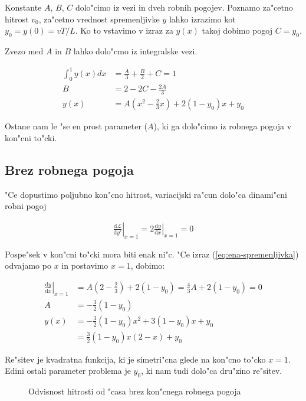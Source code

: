 \documentclass[12pt]{article}
\newcommand{\dd}{\mathrm{d}}
\begin{document}
Konstante $A$, $B$, $C$ dolo"cimo iz vezi in dveh robnih pogojev. Poznamo za"cetno hitrost $v_0$, za"cetno vrednost spremenljivke $y$ lahko izrazimo kot $y_0 = y(0) = v T / L$. Ko to vstavimo v izraz za $y(x)$ takoj dobimo pogoj $C = y_0$. 

Zvezo med $A$ in $B$ lahko dolo"cmo iz integralske vezi. 

\begin{align}
\int_0^1 y(x) dx &= \frac{A}{3} + \frac{B}{2} + C = 1 \\
B &= 2 - 2C - \frac{2A}{3} \\
y(x) &= A(x^2 - \frac{2}{3}x) + 2(1-y_0)x + y_0 \label{eq:ena-spremenljivka}
\end{align}

Ostane nam le "se en prost parameter ($A$), ki ga dolo"cimo iz robnega pogoja v kon"cni to"cki. 

\subsection{Brez robnega pogoja}
"Ce dopustimo poljubno kon"cno hitrost, variacijski ra"cun dolo"ca dinami"cni robni pogoj 

\begin{align}
\left.\frac{\dd \mathcal L}{\dd y'}\right|_{x=1} = 2\left.\frac{\dd y}{\dd x}\right|_{x=1} = 0 
\end{align}

Pospe"sek v kon"cni to"cki mora biti enak ni"c. "Ce izraz (\ref{eq:ena-spremenljivka}) odvajamo po $x$ in postavimo $x=1$, dobimo:

\begin{align}
\left.\frac{\dd y}{\dd x}\right|_{x=1} &= A(2 - \frac{2}{3}) + 2(1-y_0) = \frac{4}{3}A + 2(1-y_0) = 0 \\
A &= -\frac{3}{2}(1-y_0) \\
y(x) &=  -\frac{3}{2}(1-y_0)x^2 + 3(1-y_0)x + y_0 \\
  &= \frac{3}{2}(1-y_0) x (2-x) + y_0 \label{eq:brez-robnega}
\end{align}

Re"sitev je kvadratna funkcija, ki je simetri"cna glede na kon"cno to"cko $x=1$. Edini ostali parameter problema je $y_0$, ki nam tudi dolo"ca dru"zino re"sitev. 

\begin{figure}[h!]

\label{fig:brez}
\caption{Odvisnost hitrosti od "casa brez kon"cnega robnega pogoja}
\end{figure}
\end{document}
